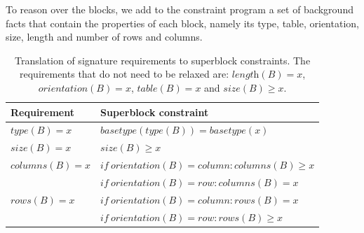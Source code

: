 \documentclass{IEEEtran}
\newcommand{\tias}[1]{\textcolor{blue}{{\sc Tias:} #1}\xspace}
\newcommand{\format}[1]{\textit{#1}\xspace}
\newcommand{\plength}{\format{length}}
\newcommand{\psize}{\format{size}}
\newcommand{\ptype}{\format{type}}
\newcommand{\ptable}{\format{table}}
\newcommand{\por}{\format{orientation}}
\newcommand{\prows}{\format{rows}}
\newcommand{\pcols}{\format{columns}}
\theoremstyle{definition}
\begin{document}
To reason over the blocks, we add to the constraint program a set of background facts that contain the properties of each block, namely its type, table, orientation, size, length and number of rows and columns.
%
%
\begin{table}[t]
  \caption{Translation of signature requirements to superblock constraints. The requirements that do not need to be relaxed are: $\plength(B) = x$, $\por(B) = x$, $\ptable(B) = x$ and $\psize(B) \geq x$.}
  \label{tbl:translation}
  \begin{tabularx}{\linewidth}{lX}
    \textbf{Requirement} & \textbf{Superblock constraint} \\ \hline \hline
    $\ptype(B) = x$ & $\mathit{basetype}(\ptype(B)) = \mathit{basetype}(x)$ \\ \hline
    $\psize(B) = x$ & $\psize(B) \geq x$ \\ \hline
    $\pcols(B) = x$ & $\mathit{if}~\por(B) = \mathit{column}: \pcols(B) \geq x$ \\ 
    & $\mathit{if}~\por(B) = \mathit{row}: \pcols(B) = x$ \\ \hline
    $\prows(B) = x$ & $\mathit{if}~\por(B) = \mathit{column}: \prows(B) = x$ \\ 
    & $\mathit{if}~\por(B) = \mathit{row}: \prows(B) \geq x$
  \end{tabularx}
\end{table}
\end{document}
